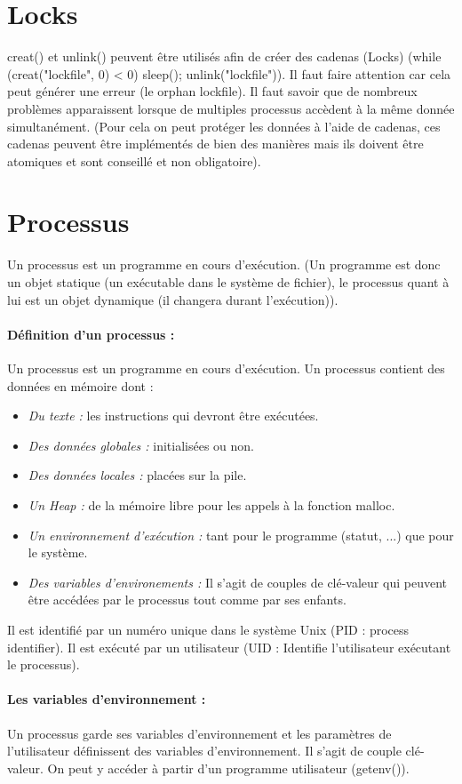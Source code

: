 \documentclass{article}[12pt]
\begin{document}
\section{Locks}
creat() et unlink() peuvent être utilisés afin de créer des cadenas (Locks) (while (creat("lockfile", 0) < 0) sleep(); unlink("lockfile")). Il faut faire attention car cela peut générer une erreur (le orphan lockfile). Il faut savoir que de nombreux problèmes apparaissent lorsque de multiples processus accèdent à la même donnée simultanément. (Pour cela on peut protéger les données à l'aide de cadenas, ces cadenas peuvent être implémentés de bien des manières mais ils doivent être atomiques et sont conseillé et non obligatoire).
\section{Processus}
Un processus est un programme en cours d'exécution. (Un programme est donc un objet statique (un exécutable dans le système de fichier), le processus quant à lui est un objet dynamique (il changera durant l'exécution)).
\paragraph{Définition d'un processus : } Un processus est un programme en cours d'exécution. Un processus contient des données en mémoire dont :
\begin{itemize}
	\item \emph{Du texte : } les instructions qui devront être exécutées.
	\item \emph{Des données globales : } initialisées ou non.
	\item \emph{Des données locales : } placées sur la pile.
	\item \emph{Un Heap : } de la mémoire libre pour les appels à la fonction malloc.
	\item \emph{Un environnement d'exécution :} tant pour le programme (statut, ...) que pour le système.
	\item \emph{Des variables d'environements : } Il s'agit de couples de clé-valeur qui peuvent être accédées par le processus tout comme par ses enfants.
\end{itemize}
Il est identifié par un numéro unique dans le système Unix (PID : process identifier). Il est exécuté par un utilisateur (UID : Identifie l'utilisateur exécutant le processus). 
\paragraph{Les variables d'environnement : } Un processus garde ses variables d'environnement et les paramètres de l'utilisateur définissent des variables d'environnement. Il s'agit de couple clé-valeur. On peut y accéder à partir d'un programme utilisateur (getenv()).
\end{document}
